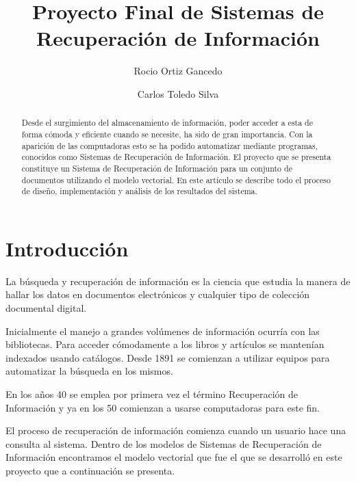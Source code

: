 \documentclass[runningheads]{llncs}
\begin{document}
	\hyphenation{}
	
	\title{Proyecto Final de Sistemas de Recuperaci\'on de Informaci\'on}
	
	\author{Rocio Ortiz Gancedo \and Carlos Toledo Silva}
	
	
	
	\maketitle
	
	\begin{abstract}
		Desde el surgimiento del almacenamiento de informaci\'on, poder acceder a esta de forma c\'omoda y eficiente cuando se necesite, ha sido de gran importancia. Con la aparici\'on de las computadoras esto se ha podido automatizar mediante programas, conocidos como Sistemas de Recuperaci\'on de Informaci\'on. El proyecto que se presenta constituye un Sistema de Recuperaci\'on de Informaci\'on para un conjunto de documentos utilizando el modelo vectorial. En este art\'iculo se describe todo el proceso de dise\~{n}o, implementaci\'on y an\'alisis de los resultados del sistema.
	\end{abstract}

	\section{Introducci\'on}
La b\'usqueda y recuperaci\'on de informaci\'on es la ciencia que estudia la manera de hallar los datos en documentos electr\'onicos y cualquier tipo de colecci\'on documental digital. 

Inicialmente el manejo a grandes vol\'umenes de informaci\'on ocurr\'ia con las bibliotecas. Para acceder c\'omodamente a los libros y art\'iculos se manten\'ian indexados usando cat\'alogos. Desde 1891 se comienzan a utilizar equipos para automatizar la b\'usqueda en los mismos. 

En los a\~{n}os 40 se emplea por primera vez el t\'ermino Recuperaci\'on de Informaci\'on y ya en los 50 comienzan a usarse computadoras para este fin.
 
El proceso de recuperaci\'on de informaci\'on comienza cuando un usuario hace una consulta al sistema. Dentro de los modelos de Sistemas de Recuperaci\'on de Informaci\'on encontramos el modelo vectorial que fue el que se desarroll\'o en este proyecto que a continuaci\'on se presenta.
\end{document}
